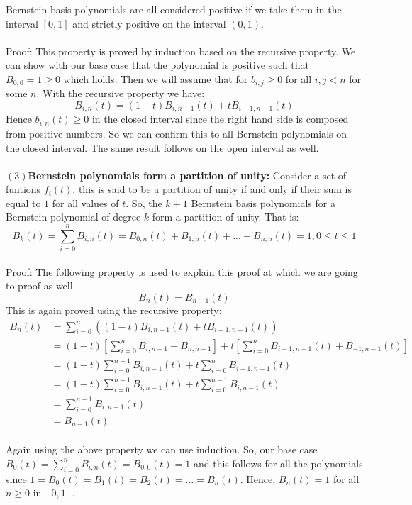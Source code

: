 \documentclass{article}
\begin{document}
Bernstein basis polynomials are all considered positive if we take them in the interval $[0,1]$ and strictly positive on the interval $(0,1)$.\paragraph{}
Proof: This property is proved by induction based on the recursive property.
We can show with our base case that the polynomial is positive such that $B_{0,0}=1\geq0$ which holds. Then we will assume that for $b_{i,j}\geq0$ for all $i,j<n$ for some $n$. With the recursive property we have:
\begin{equation*}
B_{i,n}(t)=(1-t)B_{i,n-1}(t)+tB_{i-1,n-1}(t)    
\end{equation*}
Hence $b_{i,n}(t)\geq0$ in the closed interval since the right hand side is composed from positive numbers. So we can confirm this to all Bernstein polynomials on the closed interval. The same result follows on the open interval as well.\paragraph{}
\textbf{$(3)$Bernstein polynomials form a partition of unity:}
Consider a set of funtions $f_i(t)$. this is said to be a partition of unity if and only if their sum is equal to $1$ for all values of $t$. So, the $k + 1$ Bernstein basis polynomials for a Bernstein polynomial of degree $k$ form a partition of unity. That is:
\begin{equation*}
B_k(t)=\sum_{i=0}^nB_{i,n}(t)= B_{0,n}(t)+B_{1,n}(t)+...+B_{n,n}(t)=1,  0\leq t\leq 1  
\end{equation*}\paragraph{}
Proof: The following property is used to explain this proof at which we are going to proof as well.
\begin{equation*}
B_n(t)=B_{n-1}(t)    
\end{equation*}
This is again proved using the recursive property:
\begin{align*}
B_n(t)&=\sum_{i=0}^n((1-t)B_{i,n-1}(t)+tB_{i-1,n-1}(t))\\
&=(1-t)\left[\sum_{i=0}^nB_{i,n-1}+B_{n,n-1}\right]+t\left[\sum_{i=0}^nB_{i-1,n-1}(t)+B_{-1,n-1}(t)\right]\\
&=(1-t)\sum_{i=0}^{n-1}B_{i,n-1}(t)+t\sum_{i=0}^{n}B_{i-1,n-1}(t)\\
&=(1-t)\sum_{i=0}^{n-1}B_{i,n-1}(t)+t\sum_{i=0}^{n-1}B_{i,n-1}(t)\\
&=\sum_{i=0}^{n-1}B_{i,n-1}(t)\\
&=B_{n-1}(t)
\end{align*}\paragraph{}
Again using the above property we can use induction. So, our base case $B_0(t)=\sum_{i=0}^nB_{i,n}(t)=B_{0,0}(t)=1$ and this follows for all the polynomials since $1=B_0(t)=B_1(t)=B_2(t)=\dots=B_n(t)$. Hence, $B_n(t)=1$ for all $n\geq0$ in $[0,1]$.
\end{document}
